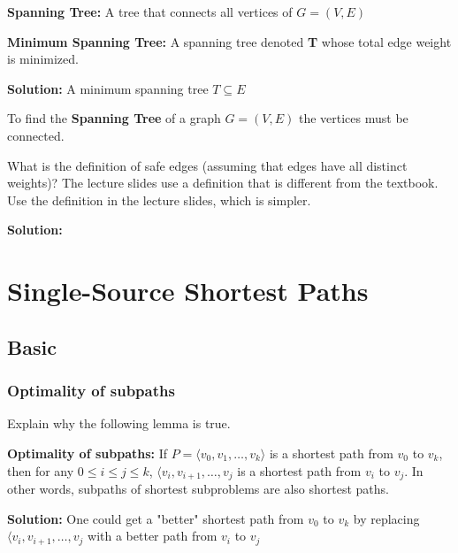 \documentclass[11pt,fleqn]{book}
\begin{document}
\begin{definition}
\textbf{Spanning Tree:} A tree that connects all vertices of $G = (V,E)$
\end{definition}
\begin{definition}
\textbf{Minimum Spanning Tree:} A spanning tree denoted \textbf{T} whose total edge weight is minimized. 
\end{definition}
\textbf{Solution:} A minimum spanning tree $T \subseteq E$
\begin{remark}
To find the \textbf{Spanning Tree} of a graph $G = (V,E)$ the vertices must be connected. 
\end{remark}
\vspace{1em}
\begin{example}
What is the definition of safe edges (assuming that edges have all distinct weights)? The lecture slides use a definition that is different from the textbook. Use the definition in the lecture slides, which is simpler. 
\end{example}
\textbf{Solution:} 
\chapter{Single-Source Shortest Paths}
\section*{Basic}
\vspace{1em}
\subsection{Optimality of subpaths}
\begin{example}
Explain why the following lemma is true. \\
\begin{lemma}
\textbf{Optimality of subpaths:} If $P = \langle v_0, v_1, \dots, v_k\rangle$ is a shortest path from $v_0$ to $v_k$, then for any $0 \leq i \leq j \leq k$, $\langle v_i, v_{i + 1}, \dots, v_{j}$ is a shortest path from $v_i$ to $v_j$. In other words, subpaths of shortest subproblems are also shortest paths.
\end{lemma}
\end{example}
\textbf{Solution:} One could get a "better" shortest path from $v_0$ to $v_k$ by replacing $\langle v_i, v_{i+1}, \dots, v_j$ with a better path from $v_i$ to $v_j$
\end{document}
